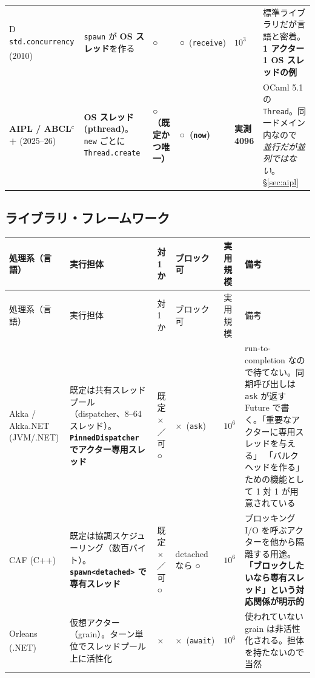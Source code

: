 \documentclass[11pt,a4paper]{ltjsarticle}
\newcommand{\dg}{\textsuperscript{\dag}}
\newcommand{\yes}{\textbf{○}}
\newcommand{\no}{×}
\begin{document}
\begin{landscape}
\begin{longtable}{@{}p{3.3cm}p{4.6cm}>{\raggedright\arraybackslash}p{2.5cm}>{\raggedright\arraybackslash}p{2.6cm}>{\raggedright\arraybackslash}p{1.5cm}p{6.0cm}@{}}
D \texttt{std.concurrency} (2010)\dg
  & \texttt{spawn} が \textbf{OS スレッド}を作る
  & \yes
  & \yes\ (\texttt{receive})
  & $10^{3}$
  & 標準ライブラリだが言語と密着。
    \textbf{1 アクター 1 OS スレッドの例} \\

\textbf{AIPL / ABCL$^{c}$+} (2025--26)
  & \textbf{OS スレッド (pthread)}。\texttt{new} ごとに \texttt{Thread.create}
  & \textbf{\yes（既定かつ唯一）}
  & \textbf{\yes\ (\texttt{now})}
  & \textbf{実測 4096}
  & OCaml 5.1 の \texttt{Thread}。同一ドメイン内なので
    \emph{並行だが並列ではない}。\S\ref{sec:aipl} \\
\end{longtable}

\subsection{ライブラリ・フレームワーク}

\begin{longtable}{@{}p{3.3cm}p{4.6cm}>{\raggedright\arraybackslash}p{2.5cm}>{\raggedright\arraybackslash}p{2.6cm}>{\raggedright\arraybackslash}p{1.5cm}p{6.0cm}@{}}
\toprule
処理系（言語） & 実行担体 & 1 対 1 か & ブロック可 & 実用規模 & 備考 \\
\midrule
\endfirsthead
\toprule
処理系（言語） & 実行担体 & 1 対 1 か & ブロック可 & 実用規模 & 備考 \\
\midrule
\endhead
\bottomrule
\endfoot

Akka / Akka.NET (JVM/.NET)
  & 既定は共有スレッドプール（dispatcher、8--64 スレッド）。
    \textbf{\texttt{PinnedDispatcher} でアクター専用スレッド}
  & 既定 \no ／可 \yes
  & \no\ (\texttt{ask})
  & $10^{6}$
  & run-to-completion なので待てない。同期呼び出しは \texttt{ask} が返す
    Future で書く。「重要なアクターに専用スレッドを与える」
    「バルクヘッドを作る」ための機能として 1 対 1 が用意されている \\

CAF (C++)
  & 既定は協調スケジューリング（数百バイト）。
    \textbf{\texttt{spawn<detached>} で専有スレッド}
  & 既定 \no ／可 \yes
  & detached なら \yes
  & $10^{6}$
  & ブロッキング I/O を呼ぶアクターを他から隔離する用途。
    \textbf{「ブロックしたいなら専有スレッド」という対応関係が明示的} \\

Orleans (.NET)\dg
  & 仮想アクター（grain）。ターン単位でスレッドプール上に活性化
  & \no
  & \no\ (\texttt{await})
  & $10^{6}$
  & 使われていない grain は非活性化される。担体を持たないので当然 \\


\end{longtable}
\end{landscape}
\end{document}
